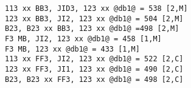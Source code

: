 \documentclass[main.tex]{subfiles}
\begin{document}
\begin{lstlisting}[language=FG]
113 xx BB3, JID3, 123 xx @db1@ = 538 [2,M]
123 xx BB3, JI2, 123 xx @db1@ = 504 [2,M]
B23, B23 xx BB3, 123 xx @db1@ =498 [2,M]
F3 MB, JI2, 123 xx @db1@ = 458 [1,M]
F3 MB, 123 xx @db1@ = 433 [1,M]
113 xx FF3, JI2, 123 xx @db1@ = 522 [2,C]
123 xx FF3, JI1, 123 xx @db1@ = 490 [2,C]
B23, B23 xx FF3, 123 xx @db1@ = 498 [2,C]
\end{lstlisting}




\end{document}
